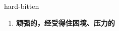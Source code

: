 
\begin{frame}
{\huge hard-bitten}
\begin{center}
\begin{enumerate}\Large
  \item \textbf{顽强的，经受得住困境、压力的}
\end{enumerate}
\end{center}
\end{frame}
